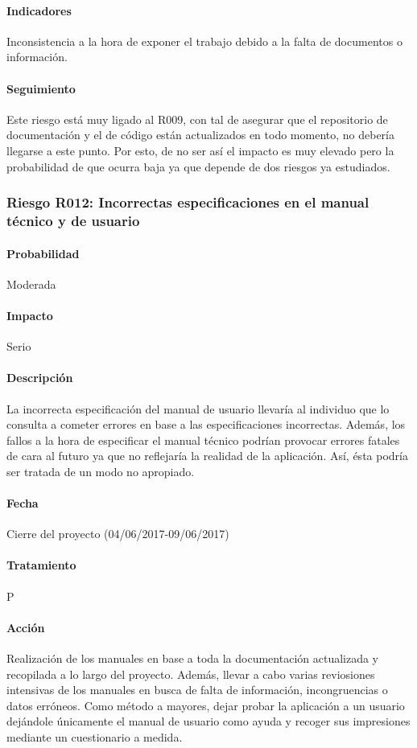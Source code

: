 \documentclass[10pt,a4paper]{article}
\begin{document}
				\paragraph{Indicadores} Inconsistencia a la hora de exponer el trabajo debido a la falta de documentos o información.
				\paragraph{Seguimiento}	Este riesgo está muy ligado al R009, con tal de asegurar que el repositorio de documentación y el de código están actualizados en todo momento, no debería llegarse a este punto. Por esto, de no ser así el impacto es muy elevado pero la probabilidad de que ocurra baja ya que depende de dos riesgos ya estudiados.			
				
			\subsubsection{Riesgo R012: Incorrectas especificaciones en el manual técnico y de usuario}
				\paragraph{Probabilidad} Moderada
				\paragraph{Impacto}	Serio
				\paragraph{Descripción} La incorrecta especificación del manual de usuario llevaría al individuo que lo consulta a cometer errores en base a las especificaciones incorrectas. Además, los fallos a la hora de especificar el manual técnico podrían provocar errores fatales de cara al futuro ya que no reflejaría la realidad de la aplicación. Así, ésta podría ser tratada de un modo no apropiado.
				\paragraph{Fecha} Cierre del proyecto (04/06/2017-09/06/2017)
				\paragraph{Tratamiento} P
				\paragraph{Acción} Realización de los manuales en base a toda la documentación actualizada y recopilada a lo largo del proyecto. Además, llevar a cabo varias reviosiones intensivas de los manuales en busca de falta de información, incongruencias o datos erróneos. Como método a mayores, dejar probar la aplicación a un usuario dejándole únicamente el manual de usuario como ayuda y recoger sus impresiones mediante un cuestionario a medida.
\end{document}
